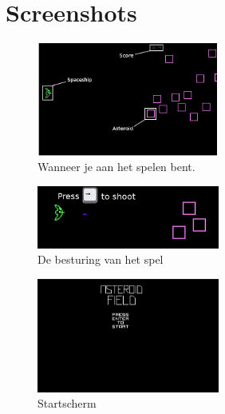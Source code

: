 \documentclass{article}
\begin{document}
\section{Screenshots}\label{screens}
\begin{figure}[htbp]
\includegraphics[width=60mm]{In_Game.jpg}
\caption{Wanneer je aan het spelen bent.}
\label{fig:ingame}
\end{figure}

\begin{figure}[htbp]
\includegraphics[width=60mm]{PressToShoot.jpg}
\caption{De besturing van het spel}
\label{fig:besturing}
\end{figure}

\begin{figure}[htbp]
\includegraphics[width=60mm]{Menu.jpg}
\caption{Startscherm}
\label{fig:menu}
\end{figure}
\end{document}
